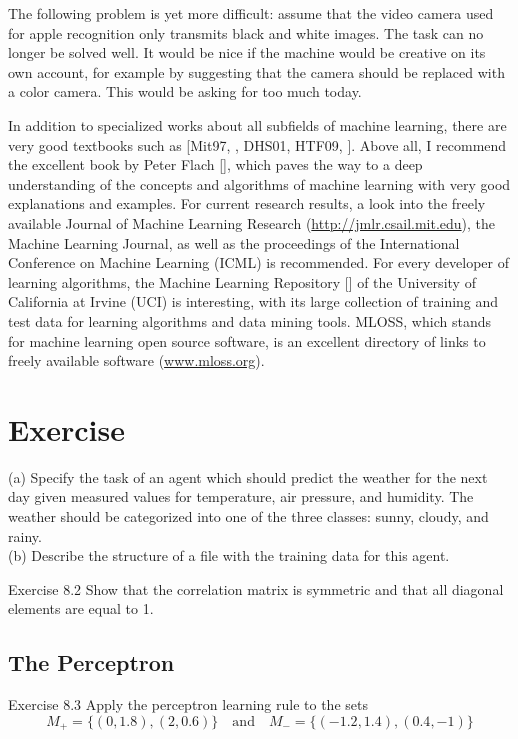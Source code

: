 \documentclass[10pt]{book}
\begin{document}
The following problem is yet more difficult: assume that the video camera used for apple recognition only transmits black and white images. The task can no longer be solved well. It would be nice if the machine would be creative on its own account, for example by suggesting that the camera should be replaced with a color camera. This would be asking for too much today.

In addition to specialized works about all subfields of machine learning, there are very good textbooks such as [Mit97, \cite{bishop2006prml}, DHS01, HTF09, \cite{alpaydin2004introduction}]. Above all, I recommend the excellent book by Peter Flach [\cite{flach2012ml}], which paves the way to a deep understanding of the concepts and algorithms of machine learning with very good explanations and examples. For current research results, a look into the freely available Journal of Machine Learning Research (\href{http://jmlr.csail.mit.edu}{http://jmlr.csail.mit.edu}), the Machine Learning Journal, as well as the proceedings of the International Conference on Machine Learning (ICML) is recommended. For every developer of learning algorithms, the Machine Learning Repository [\cite{blake1998uci}] of the University of California at Irvine (UCI) is interesting, with its large collection of training and test data for learning algorithms and data mining tools. MLOSS, which stands for machine learning open source software, is an excellent directory of links to freely available software (\href{http://www.mloss.org}{www.mloss.org}).

\section{Exercise}
(a) Specify the task of an agent which should predict the weather for the next day given measured values for temperature, air pressure, and humidity. The weather should be categorized into one of the three classes: sunny, cloudy, and rainy.\\
(b) Describe the structure of a file with the training data for this agent.

Exercise 8.2 Show that the correlation matrix is symmetric and that all diagonal elements are equal to 1.

\subsection{The Perceptron}
Exercise 8.3 Apply the perceptron learning rule to the sets
$$
M_{+}=\{(0,1.8),(2,0.6)\} \quad \text{and} \quad M_{-}=\{(-1.2,1.4),(0.4,-1)\}
$$
\end{document}
